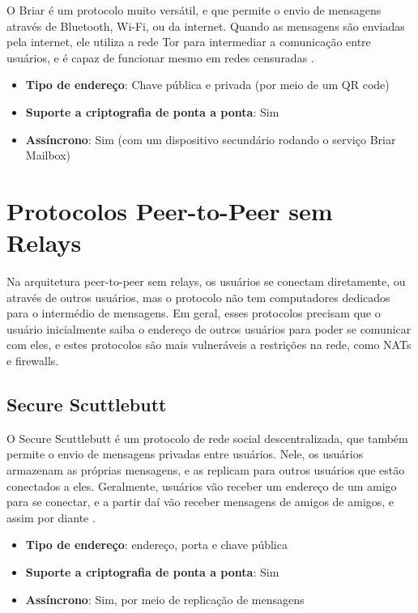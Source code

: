 O Briar é um protocolo muito versátil, e que permite o envio de mensagens através de Bluetooth, Wi-Fi, ou da internet. Quando as mensagens são enviadas pela internet, ele utiliza a rede Tor para intermediar a comunicação entre usuários, e é capaz de funcionar mesmo em redes censuradas \cite{briar}.

\begin{itemize}
  \item \textbf{Tipo de endereço}: Chave pública e privada (por meio de um QR code)
  \item \textbf{Suporte a criptografia de ponta a ponta}: Sim
  \item \textbf{Assíncrono}: Sim (com um dispositivo secundário rodando o serviço Briar Mailbox)
\end{itemize}

\section{Protocolos Peer-to-Peer sem Relays}

Na arquitetura peer-to-peer sem relays, os usuários se conectam diretamente, ou através de outros usuários, mas o protocolo não tem computadores dedicados para o intermédio de mensagens. Em geral, esses protocolos precisam que o usuário inicialmente saiba o endereço de outros usuários para poder se comunicar com eles, e estes protocolos são mais vulneráveis a restrições na rede, como NATs e firewalls.

\subsection{Secure Scuttlebutt}

O Secure Scuttlebutt é um protocolo de rede social descentralizada, que também permite o envio de mensagens privadas entre usuários. Nele, os usuários armazenam as próprias mensagens, e as replicam para outros usuários que estão conectados a eles. Geralmente, usuários vão receber um endereço de um amigo para se conectar, e a partir daí vão receber mensagens de amigos de amigos, e assim por diante \cite{scuttlebutt}.

\begin{itemize}
  \item \textbf{Tipo de endereço}: endereço, porta e chave pública
  \item \textbf{Suporte a criptografia de ponta a ponta}: Sim
  \item \textbf{Assíncrono}: Sim, por meio de replicação de mensagens
\end{itemize}

